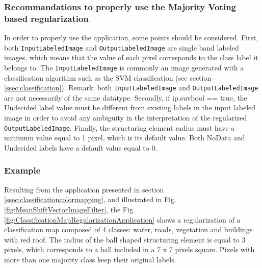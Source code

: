 \subsubsection{Recommandations to properly use the Majority Voting based regularization}

In order to properly use the  application, some points should be considered.
First, both \verb?InputLabeledImage? and \verb?OutputLabeledImage? are single band labeled images, which means that the
value of each pixel corresponds to the class label it belongs to. The \verb?InputLabeledImage? is commonly an image generated
with a classification algorithm such as the SVM classification (see section \ref{ssec:classification}). Remark: both
\verb?InputLabeledImage? and \verb?OutputLabeledImage? are not necessarily of the same datatype. Secondly, if ip.suvbool == true,
the Undecided label value must be different from existing labels in the input labeled image in order to avoid any ambiguity in the
interpretation of the regularized \verb?OutputLabeledImage?. Finally, the structuring element radius must have a minimum value equal to 1 pixel,
which is its default value. Both NoData and Undecided labels have a default value equal to 0.


\subsubsection{Example}

Resulting from the  application presented in section \ref{ssec:classificationcolormapping}, and illustrated in
Fig. \ref{fig:MeanShiftVectorImageFilter}, the Fig. \ref{fig:ClassificationMapRegularizationApplication} shows a regularization of a classification
map composed of 4 classes: water, roads, vegetation and buildings with red roof. The radius of the ball shaped structuring element is equal to 3 pixels,
which corresponds to a ball included in a 7 x 7 pixels square. Pixels with more than one majority class keep their original labels.


